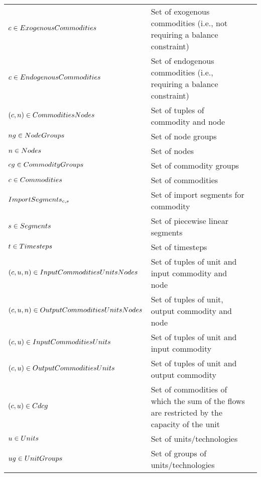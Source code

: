 	\begin{longtable}{p{\cola} p{\colc} >{\small\raggedleft\arraybackslash\itshape}p{\colb}}
		$c \in ExogenousCommodities$	& Set of exogenous commodities (i.e., not requiring a balance constraint)	&                \\
		$c \in EndogenousCommodities$	& Set of endogenous commodities (i.e., requiring a balance constraint)	&                \\
		$(c, n) \in CommoditiesNodes$	& Set of tuples of commodity and node                         	&                \\
		$ng \in NodeGroups    $	& Set of node groups                                          	&                \\
		$n \in Nodes         $	& Set of nodes                                                	&                \\
		$cg \in CommodityGroups$	& Set of commodity groups                                     	&                \\
		$c \in Commodities   $	& Set of commodities                                          	&                \\
		$ImportSegments_{c,s}$	& Set of import segments \segment for commodity \commodity    	&                \\
		$s \in Segments      $	& Set of piecewise linear segments                            	&                \\
		$t \in Timesteps     $	& Set of timesteps                                            	&                \\
		$(c, u, n) \in InputCommoditiesUnitsNodes$	& Set of tuples of unit and input commodity and node          	&                \\
		$(c, u, n) \in OutputCommoditiesUnitsNodes$	& Set of tuples of unit, output commodity and node            	&                \\
		$(c, u) \in InputCommoditiesUnits$	& Set of tuples of unit and input commodity                   	&                \\
		$(c, u) \in OutputCommoditiesUnits$	& Set of tuples of unit and output commodity                  	&                \\
		$(c, u) \in Cdcg          $	& Set of commodities of which the sum of the flows are restricted by the capacity of the unit	&                \\
		$u \in Units         $	& Set of units/technologies                                   	&                \\
		$ug \in UnitGroups    $	& Set of groups of units/technologies                         	&                \\
	\end{longtable}

